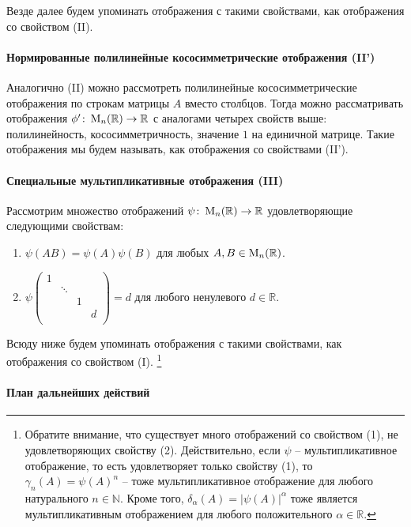 Везде далее будем упоминать отображения с такими свойствами, как отображения со свойством (II).

\paragraph{Нормированные полилинейные кососимметрические отображения (II')}

Аналогично (II) можно рассмотреть полилинейные кососимметрические отображения по строкам матрицы $A$ вместо столбцов.
Тогда можно рассматривать отображения $\phi'\colon \operatorname{M}_{n}(\mathbb R)\to \mathbb R$ с аналогами четырех свойств выше: полилинейность, кососимметричность, значение $1$ на единичной матрице.
Такие отображения мы будем называть, как отображения со свойствами (II').


\paragraph{Специальные мультипликативные отображения (III)} 

Рассмотрим множество отображений $\psi\colon \operatorname{M}_{n}(\mathbb R)\to \mathbb R$ удовлетворяющие следующими свойствам:
\begin{enumerate}
\item $\psi(AB) = \psi(A)\psi(B)$ для любых $A,B\in\operatorname{M}_{n}(\mathbb R)$.

\item 
$
\psi
\begin{pmatrix}
{1}&{}&{}&{}\\
{}&{\ddots}&{}&{}\\
{}&{}&{1}&{}\\
{}&{}&{}&{d}\\
\end{pmatrix}
= 
d
$ для любого ненулевого $d\in\mathbb R$.
\end{enumerate}
Всюду ниже будем упоминать отображения с такими свойствами, как отображения со свойством (I).%
\footnote{Обратите внимание, что существует много отображений со свойством (1), не удовлетворяющих свойству (2).
Действительно, если $\psi$ -- мультипликативное отображение, то есть удовлетворяет только свойству (1), то $\gamma_n(A) = \psi(A)^n$ -- тоже мультипликативное отображение для любого натурального $n\in \mathbb N$.
Кроме того, $\delta_\alpha(A) = |\psi(A)|^\alpha$ тоже является мультипликативным отображением для любого положительного $\alpha\in \mathbb R$.}


\paragraph{План дальнейших действий} 

